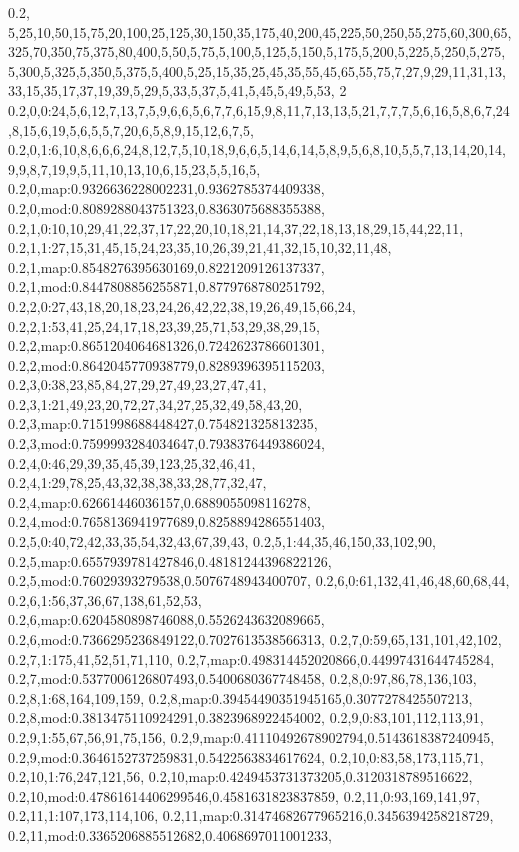 0.2,
5,25,10,50,15,75,20,100,25,125,30,150,35,175,40,200,45,225,50,250,55,275,60,300,65,325,70,350,75,375,80,400,5,50,5,75,5,100,5,125,5,150,5,175,5,200,5,225,5,250,5,275,5,300,5,325,5,350,5,375,5,400,5,25,15,35,25,45,35,55,45,65,55,75,7,27,9,29,11,31,13,33,15,35,17,37,19,39,5,29,5,33,5,37,5,41,5,45,5,49,5,53,
2
0.2,0,0:24,5,6,12,7,13,7,5,9,6,6,5,6,7,7,6,15,9,8,11,7,13,13,5,21,7,7,7,5,6,16,5,8,6,7,24,8,15,6,19,5,6,5,5,7,20,6,5,8,9,15,12,6,7,5,
0.2,0,1:6,10,8,6,6,6,24,8,12,7,5,10,18,9,6,6,5,14,6,14,5,8,9,5,6,8,10,5,5,7,13,14,20,14,9,9,8,7,19,9,5,11,10,13,10,6,15,23,5,5,16,5,
0.2,0,map:0.9326636228002231,0.9362785374409338,
0.2,0,mod:0.8089288043751323,0.8363075688355388,
0.2,1,0:10,10,29,41,22,37,17,22,20,10,18,21,14,37,22,18,13,18,29,15,44,22,11,
0.2,1,1:27,15,31,45,15,24,23,35,10,26,39,21,41,32,15,10,32,11,48,
0.2,1,map:0.8548276395630169,0.8221209126137337,
0.2,1,mod:0.8447808856255871,0.8779768780251792,
0.2,2,0:27,43,18,20,18,23,24,26,42,22,38,19,26,49,15,66,24,
0.2,2,1:53,41,25,24,17,18,23,39,25,71,53,29,38,29,15,
0.2,2,map:0.8651204064681326,0.7242623786601301,
0.2,2,mod:0.8642045770938779,0.8289396395115203,
0.2,3,0:38,23,85,84,27,29,27,49,23,27,47,41,
0.2,3,1:21,49,23,20,72,27,34,27,25,32,49,58,43,20,
0.2,3,map:0.7151998688448427,0.754821325813235,
0.2,3,mod:0.7599993284034647,0.7938376449386024,
0.2,4,0:46,29,39,35,45,39,123,25,32,46,41,
0.2,4,1:29,78,25,43,32,38,38,33,28,77,32,47,
0.2,4,map:0.62661446036157,0.6889055098116278,
0.2,4,mod:0.7658136941977689,0.8258894286551403,
0.2,5,0:40,72,42,33,35,54,32,43,67,39,43,
0.2,5,1:44,35,46,150,33,102,90,
0.2,5,map:0.6557939781427846,0.48181244396822126,
0.2,5,mod:0.76029393279538,0.5076748943400707,
0.2,6,0:61,132,41,46,48,60,68,44,
0.2,6,1:56,37,36,67,138,61,52,53,
0.2,6,map:0.6204580898746088,0.5526243632089665,
0.2,6,mod:0.7366295236849122,0.7027613538566313,
0.2,7,0:59,65,131,101,42,102,
0.2,7,1:175,41,52,51,71,110,
0.2,7,map:0.498314452020866,0.44997431644745284,
0.2,7,mod:0.5377006126807493,0.5400680367748458,
0.2,8,0:97,86,78,136,103,
0.2,8,1:68,164,109,159,
0.2,8,map:0.39454490351945165,0.3077278425507213,
0.2,8,mod:0.3813475110924291,0.3823968922454002,
0.2,9,0:83,101,112,113,91,
0.2,9,1:55,67,56,91,75,156,
0.2,9,map:0.41110492678902794,0.5143618387240945,
0.2,9,mod:0.3646152737259831,0.5422563834617624,
0.2,10,0:83,58,173,115,71,
0.2,10,1:76,247,121,56,
0.2,10,map:0.4249453731373205,0.3120318789516622,
0.2,10,mod:0.47861614406299546,0.4581631823837859,
0.2,11,0:93,169,141,97,
0.2,11,1:107,173,114,106,
0.2,11,map:0.31474682677965216,0.3456394258218729,
0.2,11,mod:0.3365206885512682,0.4068697011001233,
